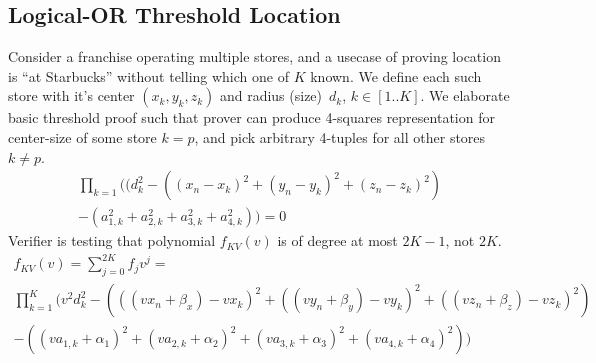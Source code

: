 \documentclass{article}
\begin{document}
\subsection{Logical-OR Threshold Location}

Consider a franchise operating multiple stores,
and a usecase of proving location is ``at Starbucks'' without telling which one of $K$ known.
We define each such store with it's center $(x_k, y_k, z_k)$ and radius (size)~$d_k$, $k \in [1 .. K]$.
We elaborate basic threshold proof such that prover can produce
4-squares representation for center-size of some store $k=p$,
and pick arbitrary 4-tuples for all other stores $k \ne p$.
\begin{multline}
\label{eq-distn-or}
  \prod_{k=1}
    ((d_k^2 - ((x_n - x_k)^2 + (y_n - y_k)^2 + (z_n - z_k)^2) \\
     - (a_{1, k}^2 + a_{2, k}^2 + a_{3, k}^2 + a_{4, k}^2)) = 0
\end{multline}
Verifier is testing that polynomial $f_{KV}(v)$ is of degree at most $2K-1$, not $2K$.
\begin{multline}
  f_{KV}(v) = \sum_{j=0}^{2K} f_j v^j = \\
  \prod_{k=1}^{K} (
    v^2 d_k^2 - (((v x_n + \beta_x) - v x_k)^2 +
               ((v y_n + \beta_y) - v y_k)^2 +
               ((v z_n + \beta_z) - v z_k)^2)  \\
        - ((v a_{1,k} + \alpha_1)^2 +
           (v a_{2,k} + \alpha_2)^2 +
           (v a_{3,k} + \alpha_3)^2 +
           (v a_{4,k} + \alpha_4)^2) )
\end{multline}



% 


\end{document}
